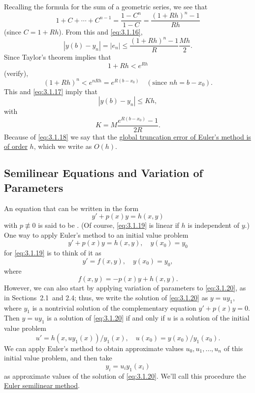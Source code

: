 \documentclass{ximera}
\begin{document}
Recalling the formula for the sum of a geometric series, we see that
$$
1+C+\cdots+C^{n-1}=\frac{1-C^n}{1-C}=\frac{(1+Rh)^n-1}{Rh}
$$
(since $C=1+Rh$). From this and \eqref{eq:3.1.16},
\begin{equation} \label{eq:3.1.17}
|y(b)-y_n|=|e_n|\leq \frac{(1+Rh)^n-1}{R}\frac{Mh}{2}.
\end{equation}
Since Taylor's theorem implies that
$$
1+Rh<e^{Rh}
$$
(verify),
$$
(1+Rh)^n<e^{nRh}=e^{R(b-x_0)}\quad (\mbox{since }nh=b-x_0).
$$
This and \eqref{eq:3.1.17} imply that
\begin{equation} \label{eq:3.1.18}
|y(b)-y_n|\leq Kh,
\end{equation}
with
$$
K=M\frac{e^{R(b-x_0)}-1}{2R}.
$$
Because of \eqref{eq:3.1.18} we say that the
\href{http://www-history.mcs.st-and.ac.uk/Mathematicians/Euler.html}{global truncation
error of Euler's method is of order} $h$, which we write as $O(h)$.

\subsection*{Semilinear Equations and Variation of Parameters}

An equation that can be written in the form
\begin{equation} \label{eq:3.1.19}
y'+p(x)y=h(x,y)
\end{equation}
with $p\not\equiv0$ is said to be . (Of course,
\eqref{eq:3.1.19} is linear if $h$ is independent of $y$.) One way to
apply Euler's method to an initial value problem
\begin{equation} \label{eq:3.1.20}
y'+p(x)y=h(x,y),\quad y(x_0)=y_0
\end{equation}
for \eqref{eq:3.1.19} is to think of it  as
$$
y'=f(x,y),\quad y(x_0)=y_0,
$$
where
$$
f(x,y)=-p(x)y+h(x,y).
$$
However, we can also start by applying variation of parameters to
\eqref{eq:3.1.20}, as in Sections~2.1\ and 2.4;   thus, we
write the solution of \eqref{eq:3.1.20} as $y=uy_1$, where $y_1$ is a
nontrivial solution of the complementary equation $y'+p(x)y=0$. Then
$y=uy_1$ is a solution of \eqref{eq:3.1.20} if and only if $u$ is a
solution of the initial value problem
\begin{equation} \label{eq:3.1.21}
u'=h(x,uy_1(x))/y_1(x),\quad u(x_0)=y(x_0)/y_1(x_0).
\end{equation}
We can apply Euler's method to obtain approximate values
$u_0, u_1, \dots, u_n$ of this initial value problem, and then take
$$
y_i=u_iy_1(x_i)
$$
as approximate values of the solution of \eqref{eq:3.1.20}.
We'll call this procedure the
\href{http://www-history.mcs.st-and.ac.uk/Mathematicians/Euler.html}{Euler semilinear method}.
\end{document}
